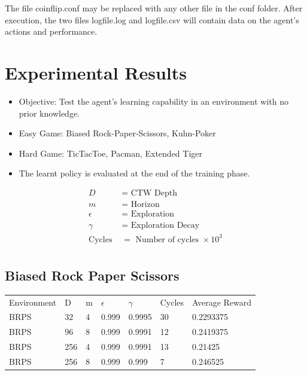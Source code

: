 \documentclass{article}
\theoremstyle{definition}
\newtheorem{primary statistics}[definition]{Primary Statistics}
\newtheorem{auxiliary statistics}[definition]{Auxiliary Statistics}
\begin{document}
The file coinflip.conf may be replaced with any other file in the conf folder.
After execution, the two files logfile.log and logfile.csv will contain data on the agent’s actions and performance.




\section{Experimental Results}


\begin{itemize}
    \item{Objective: Test the agent's learning capability in an environment with no prior knowledge.}
    \item{Easy Game: Biased Rock-Paper-Scissors, Kuhn-Poker}
    \item{Hard Game: TicTacToe, Pacman, Extended Tiger}
    \item{The learnt policy is evaluated at the end of the training phase.}
\end{itemize}


 \begin{align*}
     D &= \text{ CTW Depth} \\
     m &= \text{ Horizon} \\
     \epsilon &= \text{ Exploration} \\
     \gamma &= \text{ Exploration Decay} \\
     \text{Cycles } &= \text{ Number of cycles } \times 10^3 \\
 \end{align*}

\newpage

\subsection{Biased Rock Paper Scissors}
\begin{tabular}{lllllll}
\centering
Environment & D & m & $\epsilon$ & $\gamma$ & Cycles & Average Reward \\
BRPS        & 32        & 4           & 0.999       & 0.9995            & 30     & 0.2293375        \\
BRPS        & 96        & 8           & 0.999       & 0.9991            & 12     & 0.2419375       \\
BRPS        & 256       & 4           & 0.999       & 0.9991            & 13     & 0.21425        \\
BRPS        & 256       & 8           & 0.999       & 0.999             & 7      & 0.246525        
\end{tabular}
\end{document}
